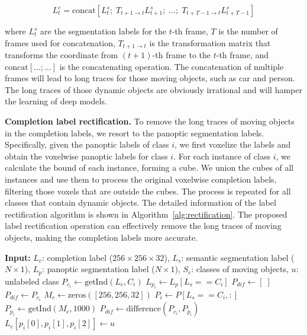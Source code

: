 \documentclass[10pt,twocolumn,letterpaper]{article}
\begin{document}
\begin{equation}
  L^c_t = \text{concat}\left[L^s_t;\; T_{t+1\to t} L^s_{t+1};\; \ldots;\; T_{t+T-1\to t} L^s_{t+T-1}\right]
  \label{eq:label_gen}
\end{equation}

where $L^s_t$ are the segmentation labels for the $t$-th frame, $T$ is the number of frames used for concatenation, $T_{t+1\to t}$ is the transformation matrix that transforms the coordinate from $(t+1)$-th frame to the $t$-th frame, and $\text{concat}[\ldots;\ldots]$ is the concatenating operation. The concatenation of multiple frames will lead to long traces for those moving objects, such as car and person. The long traces of those dynamic objects are obviously irrational and will hamper the learning of deep models.

\textbf{Completion label rectification.}
To remove the long traces of moving objects in the completion labels, we resort to the panoptic segmentation labels. Specifically, given the panoptic labels of class $i$, we first voxelize the labels and obtain the voxelwise panoptic labels for class $i$. For each instance of class $i$, we calculate the bound of each instance, forming a cube. We union the cubes of all instances and use them to process the original voxelwise completion labels, filtering those voxels that are outside the cubes. The process is repeated for all classes that contain dynamic objects. The detailed information of the label rectification algorithm is shown in Algorithm~\ref{alg:rectification}. The proposed label rectification operation can effectively remove the long traces of moving objects, making the completion labels more accurate.

\begin{algorithm}[htbp]
\caption{Pseudocode of Label Rectification.}
\label{alg:rectification}
\begin{algorithmic}[1]
\STATE \textbf{Input:} $L_c$: completion label ($256\times256\times32$), $L_s$: semantic segmentation label ($N\times1$), $L_p$: panoptic segmentation label ($N\times1$), $S_c$: classes of moving objects, $u$: unlabeled class
  \STATE $P_{c_i} \leftarrow \text{getInd}(L_c, C_i)$ 
  \STATE $L_{p_i} \leftarrow L_p[L_s == C_i]$ 
  \STATE $P_{dif} \leftarrow [\;]$
    \STATE $P_{dif} \leftarrow P_{c_i}$
    \STATE $M_c \leftarrow \text{zeros}([256, 256, 32])$
    \STATE $P_i \leftarrow P[L_s == C_i, :]$
      \STATE $P_{p_i} \leftarrow \text{getInd}(M_c, 1000)$ 
      \STATE $P_{dif} \leftarrow \text{difference}(P_{c_i}, P_{p_i})$
    \ENDFOR
  \ENDIF
      \STATE $L_c[p_i[0], p_i[1], p_i[2]] \leftarrow u$
    \ENDFOR
  \ENDIF
\ENDFOR
\end{algorithmic}
\end{algorithm}
\end{document}
